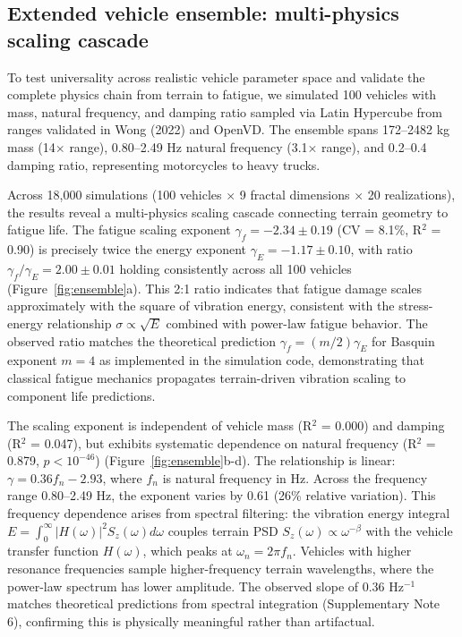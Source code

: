 \documentclass[11pt,letterpaper]{article}
\begin{document}
\subsection{Extended vehicle ensemble: multi-physics scaling cascade}

To test universality across realistic vehicle parameter space and validate the complete physics chain from terrain to fatigue, we simulated 100 vehicles with mass, natural frequency, and damping ratio sampled via Latin Hypercube from ranges validated in Wong (2022)\cite{Wong2022} and OpenVD. The ensemble spans 172--2482 kg mass (14$\times$ range), 0.80--2.49 Hz natural frequency (3.1$\times$ range), and 0.2--0.4 damping ratio, representing motorcycles to heavy trucks.

Across 18,000 simulations (100 vehicles $\times$ 9 fractal dimensions $\times$ 20 realizations), the results reveal a multi-physics scaling cascade connecting terrain geometry to fatigue life. The fatigue scaling exponent $\gamma_f = -2.34 \pm 0.19$ (CV = 8.1\%, R$^2$ = 0.90) is precisely twice the energy exponent $\gamma_E = -1.17 \pm 0.10$, with ratio $\gamma_f / \gamma_E = 2.00 \pm 0.01$ holding consistently across all 100 vehicles (Figure~\ref{fig:ensemble}a). This 2:1 ratio indicates that fatigue damage scales approximately with the square of vibration energy, consistent with the stress-energy relationship $\sigma \propto \sqrt{E}$ combined with power-law fatigue behavior. The observed ratio matches the theoretical prediction $\gamma_f = (m/2)\gamma_E$ for Basquin exponent $m = 4$ as implemented in the simulation code, demonstrating that classical fatigue mechanics propagates terrain-driven vibration scaling to component life predictions.

The scaling exponent is independent of vehicle mass (R$^2$ = 0.000) and damping (R$^2$ = 0.047), but exhibits systematic dependence on natural frequency (R$^2$ = 0.879, $p < 10^{-46}$) (Figure~\ref{fig:ensemble}b-d). The relationship is linear: $\gamma = 0.36 f_n - 2.93$, where $f_n$ is natural frequency in Hz. Across the frequency range 0.80--2.49 Hz, the exponent varies by 0.61 (26\% relative variation). This frequency dependence arises from spectral filtering: the vibration energy integral $E = \int_0^\infty |H(\omega)|^2 S_z(\omega) d\omega$ couples terrain PSD $S_z(\omega) \propto \omega^{-\beta}$ with the vehicle transfer function $H(\omega)$, which peaks at $\omega_n = 2\pi f_n$. Vehicles with higher resonance frequencies sample higher-frequency terrain wavelengths, where the power-law spectrum has lower amplitude. The observed slope of 0.36 Hz$^{-1}$ matches theoretical predictions from spectral integration (Supplementary Note 6), confirming this is physically meaningful rather than artifactual.
\end{document}
